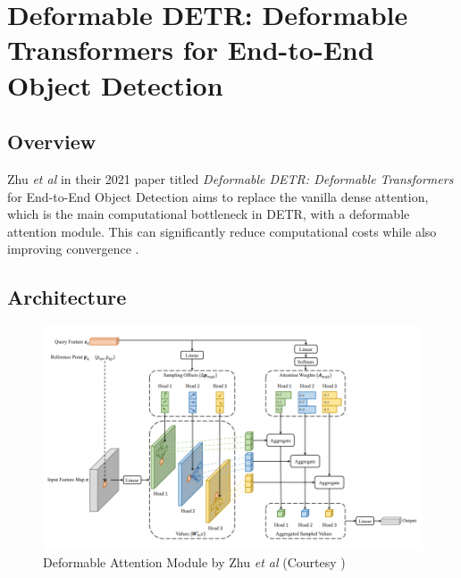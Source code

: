\section{Deformable DETR: Deformable Transformers for End-to-End Object Detection}

\label{appendix:deformable-detr-paper}

\subsection{Overview}

\par Zhu \textit{et al} in their 2021 paper titled \textit{Deformable DETR: Deformable Transformers} for End-to-End Object Detection aims to replace the vanilla dense attention, which is the main computational bottleneck in DETR, with a deformable attention module. This can significantly reduce computational costs while also improving convergence \cite{zhu2020deformable}. 
\par

\subsection{Architecture}
\begin{figure}[h]
	\centering
	\includegraphics[width=\linewidth]{assets/img/deformable-attention-module.png}
	\caption{Deformable Attention Module by Zhu
		\textit{et al} (Courtesy \cite{zhu2020deformable})}
\end{figure}

